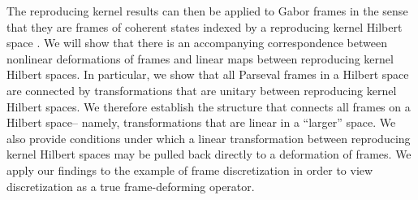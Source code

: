 \documentclass{article}
\begin{document}
The reproducing kernel results can then be applied to Gabor frames in the sense that they are frames of coherent states indexed by a reproducing kernel Hilbert space \cite{ali2014coherent, heil1989continuous}. We will show that there is an accompanying correspondence between nonlinear deformations of frames and linear maps between reproducing kernel Hilbert spaces. In particular, we show that all Parseval frames in a Hilbert space are connected by transformations that are unitary between reproducing kernel Hilbert spaces. We therefore establish the structure that connects all frames on a Hilbert space-- namely, transformations that are linear in a ``larger'' space. We also provide conditions under which a linear transformation between reproducing kernel Hilbert spaces may be pulled back directly to a deformation of frames. We apply our findings to the example of frame discretization in order to view discretization as a true frame-deforming operator.





\end{document}
